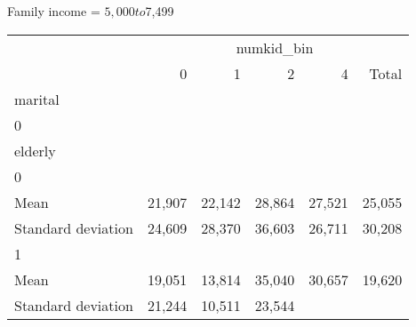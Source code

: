 Family income = $5,000 to $7,499
\begin{tabular}{llllll}
\cline{1-6}
\multicolumn{1}{c}{} &
  \multicolumn{5}{|c}{numkid\_bin} \\
\multicolumn{1}{c}{} &
  \multicolumn{1}{|r}{0} &
  \multicolumn{1}{r}{1} &
  \multicolumn{1}{r}{2} &
  \multicolumn{1}{r}{4} &
  \multicolumn{1}{r}{Total} \\
\cline{1-6}
\multicolumn{1}{l}{marital} &
  \multicolumn{1}{|r}{} &
  \multicolumn{1}{r}{} &
  \multicolumn{1}{r}{} &
  \multicolumn{1}{r}{} &
  \multicolumn{1}{r}{} \\
\multicolumn{1}{l}{\hspace{1em}0} &
  \multicolumn{1}{|r}{} &
  \multicolumn{1}{r}{} &
  \multicolumn{1}{r}{} &
  \multicolumn{1}{r}{} &
  \multicolumn{1}{r}{} \\
\multicolumn{1}{l}{\hspace{2em}elderly} &
  \multicolumn{1}{|r}{} &
  \multicolumn{1}{r}{} &
  \multicolumn{1}{r}{} &
  \multicolumn{1}{r}{} &
  \multicolumn{1}{r}{} \\
\multicolumn{1}{l}{\hspace{3em}0} &
  \multicolumn{1}{|r}{} &
  \multicolumn{1}{r}{} &
  \multicolumn{1}{r}{} &
  \multicolumn{1}{r}{} &
  \multicolumn{1}{r}{} \\
\multicolumn{1}{l}{\hspace{4em}Mean} &
  \multicolumn{1}{|r}{21,907} &
  \multicolumn{1}{r}{22,142} &
  \multicolumn{1}{r}{28,864} &
  \multicolumn{1}{r}{27,521} &
  \multicolumn{1}{r}{25,055} \\
\multicolumn{1}{l}{\hspace{4em}Standard deviation} &
  \multicolumn{1}{|r}{24,609} &
  \multicolumn{1}{r}{28,370} &
  \multicolumn{1}{r}{36,603} &
  \multicolumn{1}{r}{26,711} &
  \multicolumn{1}{r}{30,208} \\
\multicolumn{1}{l}{\hspace{3em}1} &
  \multicolumn{1}{|r}{} &
  \multicolumn{1}{r}{} &
  \multicolumn{1}{r}{} &
  \multicolumn{1}{r}{} &
  \multicolumn{1}{r}{} \\
\multicolumn{1}{l}{\hspace{4em}Mean} &
  \multicolumn{1}{|r}{19,051} &
  \multicolumn{1}{r}{13,814} &
  \multicolumn{1}{r}{35,040} &
  \multicolumn{1}{r}{30,657} &
  \multicolumn{1}{r}{19,620} \\
\multicolumn{1}{l}{\hspace{4em}Standard deviation} &
  \multicolumn{1}{|r}{21,244} &
  \multicolumn{1}{r}{10,511} &
  \multicolumn{1}{r}{23,544} &

\end{tabular}
